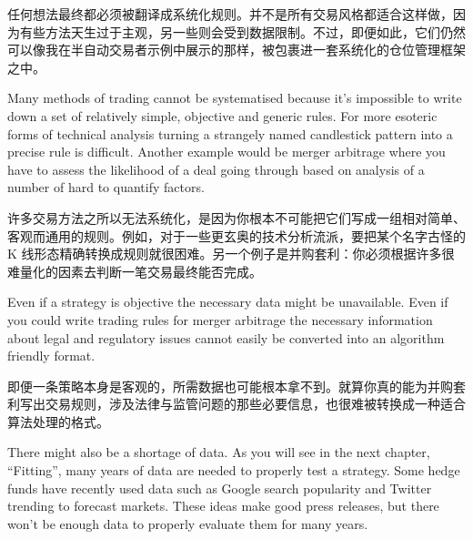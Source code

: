 \begin{chineseblock}任何想法最终都必须被翻译成系统化规则。并不是所有交易风格都适合这样做，因为有些方法天生过于主观，另一些则会受到数据限制。不过，即便如此，它们仍然可以像我在半自动交易者示例中展示的那样，被包裹进一套系统化的仓位管理框架之中。\end{chineseblock}


\begin{englishblock} Many methods of trading cannot be systematised because it's impossible to write down a set of relatively simple, objective and generic rules. For more esoteric forms of technical analysis turning a strangely named candlestick pattern into a precise rule is difficult. Another example would be merger arbitrage where you have to assess the likelihood of a deal going through based on analysis of a number of hard to quantify factors. \end{englishblock}

\begin{chineseblock}许多交易方法之所以无法系统化，是因为你根本不可能把它们写成一组相对简单、客观而通用的规则。例如，对于一些更玄奥的技术分析流派，要把某个名字古怪的 K 线形态精确转换成规则就很困难。另一个例子是并购套利：你必须根据许多很难量化的因素去判断一笔交易最终能否完成。\end{chineseblock}


\begin{englishblock} Even if a strategy is objective the necessary data might be unavailable. Even if you could write trading rules for merger arbitrage the necessary information about legal and regulatory issues cannot easily be converted into an algorithm friendly format. \end{englishblock}

\begin{chineseblock}即便一条策略本身是客观的，所需数据也可能根本拿不到。就算你真的能为并购套利写出交易规则，涉及法律与监管问题的那些必要信息，也很难被转换成一种适合算法处理的格式。\end{chineseblock}

\bipairgap

\begin{englishblock} There might also be a shortage of data. As you will see in the next chapter, ``Fitting'', many years of data are needed to properly test a strategy. Some hedge funds have recently used data such as Google search popularity and Twitter trending to forecast markets. These ideas make good press releases, but there won't be enough data to properly evaluate them for many years. \end{englishblock}

